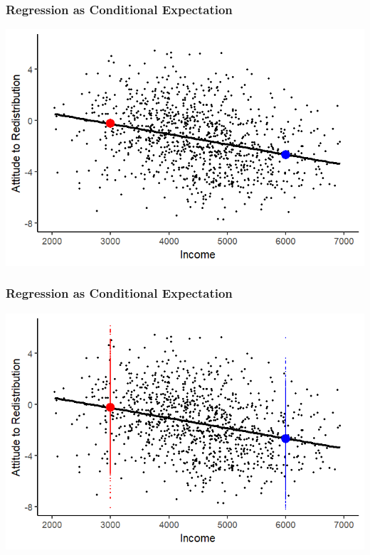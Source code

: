 \documentclass[xcolor=x11names,compress]{beamer}\usepackage[]{graphicx}\usepackage[]{color}
\makeatletter
\def\maxwidth{ %
  \ifdim\Gin@nat@width>\linewidth
    \linewidth
  \else
    \Gin@nat@width
  \fi
}
\newenvironment{knitrout}{}{} %
\renewcommand{\(}{\begin{columns}}
\renewcommand{\)}{\end{columns}}
\newcommand{\<}[1]{\begin{column}{#1}}
\renewcommand{\>}{\end{column}}
\makeatother
\begin{document}
\begin{frame}
\frametitle{Regression as Conditional Expectation}
\begin{knitrout}
\color{fgcolor}
\includegraphics[width=\maxwidth]{figure/cond_exp1-1} 

\end{knitrout}
\end{frame}

\begin{frame}
\frametitle{Regression as Conditional Expectation}
\begin{knitrout}
\color{fgcolor}
\includegraphics[width=\maxwidth]{figure/cond_exp1b-1} 

\end{knitrout}
\end{frame}
\end{document}
